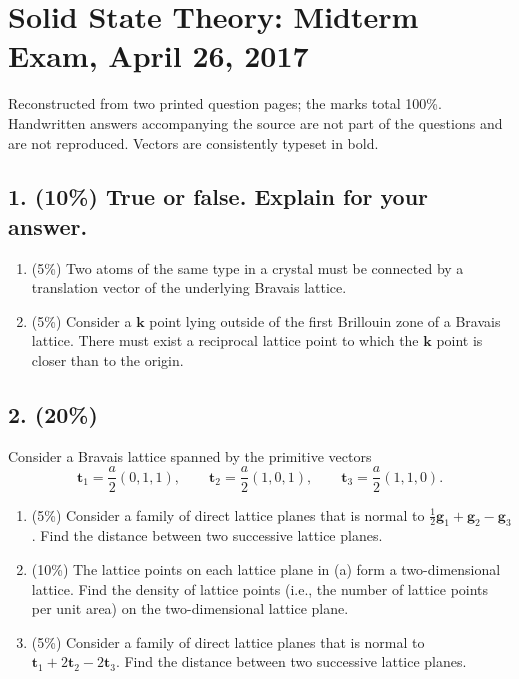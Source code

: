 \chapter{Solid State Theory: Midterm Exam, April 26, 2017}
\label{q:theory-2017-04-midterm}
\begin{sourceNote}
Reconstructed from two printed question pages; the marks total 100\%. Handwritten answers accompanying the source are not part of the questions and are not reproduced. Vectors are consistently typeset in bold.
\end{sourceNote}

\section*{1. (10\%) True or false. Explain for your answer.}
\begin{enumerate}[label=(\alph*)]
\item (5\%) Two atoms of the same type in a crystal must be connected by a translation vector of the underlying Bravais lattice.
\item (5\%) Consider a $\mathbf k$ point lying outside of the first Brillouin zone of a Bravais lattice. There must exist a reciprocal lattice point to which the $\mathbf k$ point is closer than to the origin.
\end{enumerate}

\section*{2. (20\%)}
Consider a Bravais lattice spanned by the primitive vectors
\[
\mathbf t_1=\frac a2(0,1,1),\qquad
\mathbf t_2=\frac a2(1,0,1),\qquad
\mathbf t_3=\frac a2(1,1,0).
\]
\begin{enumerate}[label=(\alph*)]
\item (5\%) Consider a family of direct lattice planes that is normal to $\frac12\mathbf g_1+\mathbf g_2-\mathbf g_3$. Find the distance between two successive lattice planes.
\item (10\%) The lattice points on each lattice plane in (a) form a two-dimensional lattice. Find the density of lattice points (i.e., the number of lattice points per unit area) on the two-dimensional lattice plane.
\item (5\%) Consider a family of direct lattice planes that is normal to $\mathbf t_1+2\mathbf t_2-2\mathbf t_3$. Find the distance between two successive lattice planes.
\end{enumerate}

